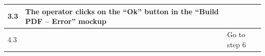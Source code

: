 {{{\begin{table}[h]
\begin{tabular}{|p{2cm}|p{6cm}|p{6cm}|}
			\hline
				\vspace{1mm} 3.3\vspace{1mm} &
				\vspace{1mm} The operator clicks on the “Ok” button in the “Build PDF – Error” mockup\vspace{1mm} & 
				\vspace{1mm} \vspace{1mm} \\
			\hline
				\vspace{1mm} 4.3\vspace{1mm} &
				\vspace{1mm} \vspace{1mm} & 
				\vspace{1mm} Go to step 6\vspace{1mm} \\
			\hline
			\end{tabular}
			\end{table}
			
			\clearpage
	
}}}
